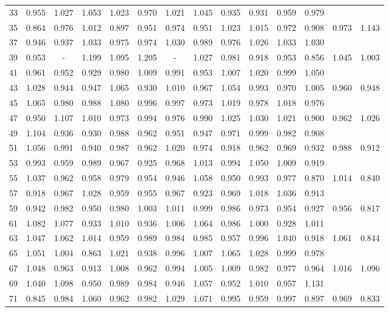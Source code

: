 \begin{table}[!hp]
\begin{tabular}{c|ccccccccccccc}
33 & 0.955 & 1.027 & 1.053 & 1.023 & 0.970 & 1.021 & 1.045 & 0.935 & 0.931 & 0.959 & 0.979 \\
35 & 0.864 & 0.976 & 1.012 & 0.897 & 0.951 & 0.974 & 0.951 & 1.023 & 1.015 & 0.972 & 0.908 & 0.973 & 1.143 \\
37 & 0.946 & 0.937 & 1.033 & 0.975 & 0.974 & 1.030 & 0.989 & 0.976 & 1.026 & 1.033 & 1.030 \\
39 & 0.953 & - & 1.199 & 1.095 & 1.205 & - & 1.027 & 0.981 & 0.918 & 0.953 & 0.856 & 1.045 & 1.003 \\
41 & 0.961 & 0.952 & 0.929 & 0.980 & 1.009 & 0.991 & 0.953 & 1.007 & 1.020 & 0.999 & 1.050 \\
43 & 1.028 & 0.944 & 0.947 & 1.065 & 0.930 & 1.010 & 0.967 & 1.054 & 0.993 & 0.970 & 1.005 & 0.960 & 0.948 \\
45 & 1.065 & 0.980 & 0.988 & 1.080 & 0.996 & 0.997 & 0.973 & 1.019 & 0.978 & 1.018 & 0.976 \\
47 & 0.950 & 1.107 & 1.010 & 0.973 & 0.994 & 0.976 & 0.990 & 1.025 & 1.030 & 1.021 & 0.900 & 0.962 & 1.026 \\
49 & 1.104 & 0.936 & 0.930 & 0.988 & 0.962 & 0.951 & 0.947 & 0.971 & 0.999 & 0.982 & 0.908 \\
51 & 1.056 & 0.991 & 0.940 & 0.987 & 0.962 & 1.020 & 0.974 & 0.918 & 0.962 & 0.969 & 0.932 & 0.988 & 0.912 \\
53 & 0.993 & 0.959 & 0.989 & 0.967 & 0.925 & 0.968 & 1.013 & 0.994 & 1.050 & 1.009 & 0.919 \\
55 & 1.037 & 0.962 & 0.958 & 0.979 & 0.954 & 0.946 & 1.058 & 0.950 & 0.993 & 0.977 & 0.870 & 1.014 & 0.840 \\
57 & 0.918 & 0.967 & 1.028 & 0.959 & 0.955 & 0.967 & 0.923 & 0.969 & 1.018 & 1.036 & 0.913 \\
59 & 0.942 & 0.982 & 0.950 & 0.980 & 1.003 & 1.011 & 0.999 & 0.986 & 0.973 & 0.954 & 0.927 & 0.956 & 0.817 \\
61 & 1.082 & 1.077 & 0.933 & 1.010 & 0.936 & 1.006 & 1.064 & 0.986 & 1.000 & 0.928 & 1.011 \\
63 & 1.047 & 1.062 & 1.014 & 0.959 & 0.989 & 0.984 & 0.985 & 0.957 & 0.996 & 1.040 & 0.918 & 1.061 & 0.844 \\
65 & 1.051 & 1.004 & 0.863 & 1.021 & 0.938 & 0.996 & 1.007 & 1.065 & 1.028 & 0.999 & 0.978 \\
67 & 1.048 & 0.963 & 0.913 & 1.008 & 0.962 & 0.994 & 1.005 & 1.009 & 0.982 & 0.977 & 0.964 & 1.016 & 1.096 \\
69 & 1.040 & 1.098 & 0.950 & 0.989 & 0.984 & 0.946 & 1.057 & 0.952 & 1.010 & 0.957 & 1.131 \\
71 & 0.845 & 0.984 & 1.060 & 0.962 & 0.982 & 1.029 & 1.071 & 0.995 & 0.959 & 0.997 & 0.897 & 0.969 & 0.833 \\

\hline \hline
\end{tabular}
\end{table}

